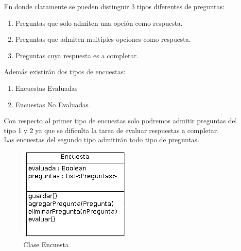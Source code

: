\documentclass{article}
\begin{document}
En donde claramente se pueden distinguir 3 tipos diferentes de preguntas:
\begin{enumerate}
\item Preguntas que solo admiten una opci\'on como respuesta.
\item Preguntas que admiten multiples opciones como respuesta.
\item Preguntas cuya respuesta es a completar.
\end{enumerate}

Adem\'as existir\'an dos tipos de encuestas:
\begin{enumerate}
\item Encuestas Evaluadas
\item Encuestas No Evaluadas.
\end{enumerate}

Con respecto al primer tipo de encuestas solo podremos admitir preguntas del tipo 1 y 2 ya que se dificulta la tarea de evaluar respuestas a completar.\\
Las encuestas del segundo tipo admitir\'an todo tipo de preguntas.



\begin{figure}[h]
\centering
\includegraphics[scale=0.8]{Encuesta}

\caption{Clase Encuesta}
\end{figure}

\end{document}
